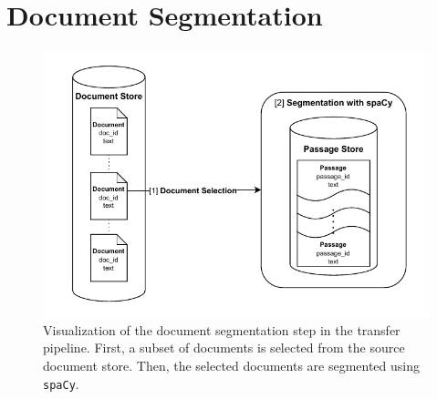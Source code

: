 \section{Document Segmentation}\label{document-segmentation}

\begin{figure}[t]
    \centering
    \includegraphics[width=\textwidth]{./graphics/drawio/document_segmentation.pdf}
    \caption{Visualization of the document segmentation step in the transfer pipeline. First, a subset of documents is selected from the source document store. Then, the selected documents are segmented using \texttt{spaCy}.}
    \label{fig:document-segmentation}
\end{figure}

